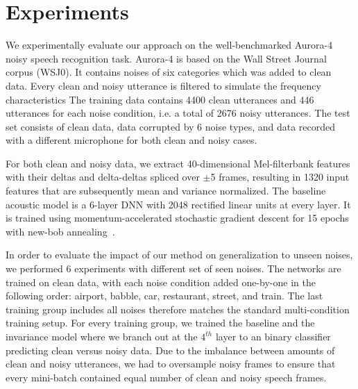 \documentclass{article}
\begin{document}

\section{Experiments}
\label{sec:experiments}
We experimentally evaluate our approach   
on the well-benchmarked Aurora-4 \citep{parihar2002aurora} noisy speech recognition task. Aurora-4
is based on the Wall Street Journal corpus (WSJ0). It contains noises of 
six categories which was added to clean data. Every clean and noisy utterance is filtered to simulate the frequency characteristics %
%
The training
data  contains 4400 clean utterances and 446 utterances for each noise condition,
i.e. a total of 2676 noisy utterances.
The test set consists of clean data, data corrupted by 6 noise types, and data recorded with a different microphone for both clean and noisy cases.

For both clean and noisy data, we extract 40-dimensional Mel-filterbank features with their deltas and 
delta-deltas spliced over $\pm$5 frames, resulting in 1320 input 
features that are subsequently mean and variance normalized.  The baseline acoustic model is a  6-layer 
DNN with 2048 rectified linear units at every layer. It is trained using momentum-accelerated stochastic gradient descent for 15 epochs with new-bob 
annealing~\citep[as in][]{morgan1995continuous,sainath2011making}.


In order to evaluate the impact of our method on generalization to unseen noises,
we performed 6 experiments with different set of seen noises. The networks are trained
on clean data, with each noise condition added one-by-one in the following order: airport, babble, car, 
restaurant, street, and train. The last training group includes all noises therefore matches the
standard multi-condition training setup. For every training group, we trained the
baseline and the invariance model where we branch out at the $4^{th}$ layer to an  
binary classifier predicting clean versus noisy data. Due to the imbalance between amounts of clean and
noisy utterances, we had to oversample noisy frames to ensure that every mini-batch contained
equal number of clean and noisy speech frames.
\end{document}
